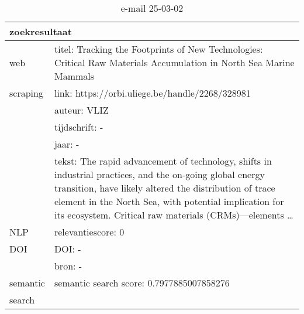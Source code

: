 \begin{table}[h!]
    \caption{e-mail 25-03-02}
    \centering
    \begin{tabularx}{\textwidth}{|p{4cm}|X|} 
        \hline
        \multicolumn{2}{|X|}{\textbf{zoekresultaat}} \\
        \hline
        web &titel: Tracking the Footprints of New Technologies: Critical Raw Materials Accumulation in North Sea Marine Mammals\\
        scraping&link: https://orbi.uliege.be/handle/2268/328981\\
        &auteur: VLIZ\\
        &tijdschrift: -\\
        &jaar: -\\
        &tekst: The rapid advancement of technology, shifts in industrial practices, and the on-going global energy transition, have likely altered the distribution of trace element in the North Sea, with potential implication for its ecosystem. Critical raw materials (CRMs)—elements …\\
        \hline
        NLP&relevantiescore: 0\\
        \hline
        DOI&DOI: -\\
        &bron: -\\
        \hline
        semantic&semantic search score: 0.7977885007858276\\
        search&\\
        \hline
    \end{tabularx}
    \label{table:email20250302}
\end{table}
